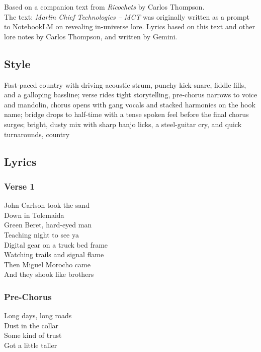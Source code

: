 Based on a companion text from \emph{Ricochets} by Carlos Thompson.\\
The text: \emph{Marlin Chief Technologies -- MCT} was originally written
as a prompt to NotebookLM on revealing in-universe lore. Lyrics based on
this text and other lore notes by Carlos Thompson, and written by
Gemini.

\subsection{Style}\label{style-13}

Fast-paced country with driving acoustic strum, punchy kick-snare,
fiddle fills, and a galloping bassline; verse rides tight storytelling,
pre-chorus narrows to voice and mandolin, chorus opens with gang vocals
and stacked harmonies on the hook name; bridge drops to half-time with a
tense spoken feel before the final chorus surges; bright, dusty mix with
sharp banjo licks, a steel-guitar cry, and quick turnarounds, country

\subsection{Lyrics}\label{lyrics-13}

\subsubsection{Verse 1}\label{verse-1-9}

John Carlson took the sand\\
Down in Tolemaida\\
Green Beret, hard-eyed man\\
Teaching night to see ya\\
Digital gear on a truck bed frame\\
Watching trails and signal flame\\
Then Miguel Morocho came\\
And they shook like brothers

\subsubsection{Pre-Chorus}\label{pre-chorus-8}

Long days, long roads\\
Dust in the collar\\
Some kind of trust\\
Got a little taller

